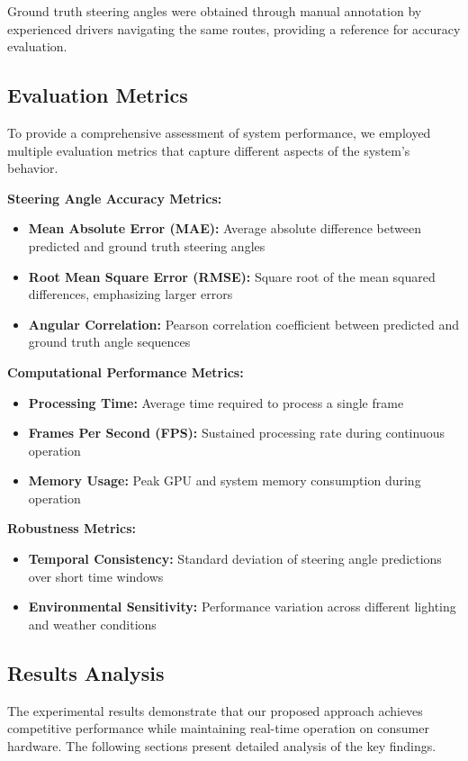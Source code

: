 \documentclass[conference]{IEEEtran}
\begin{document}
Ground truth steering angles were obtained through manual annotation by experienced drivers navigating the same routes, providing a reference for accuracy evaluation.

\subsection{Evaluation Metrics}
To provide a comprehensive assessment of system performance, we employed multiple evaluation metrics that capture different aspects of the system's behavior.

\textbf{Steering Angle Accuracy Metrics:}
\begin{itemize}
\item \textbf{Mean Absolute Error (MAE):} Average absolute difference between predicted and ground truth steering angles
\item \textbf{Root Mean Square Error (RMSE):} Square root of the mean squared differences, emphasizing larger errors
\item \textbf{Angular Correlation:} Pearson correlation coefficient between predicted and ground truth angle sequences
\end{itemize}

\textbf{Computational Performance Metrics:}
\begin{itemize}
\item \textbf{Processing Time:} Average time required to process a single frame
\item \textbf{Frames Per Second (FPS):} Sustained processing rate during continuous operation
\item \textbf{Memory Usage:} Peak GPU and system memory consumption during operation
\end{itemize}

\textbf{Robustness Metrics:}
\begin{itemize}
\item \textbf{Temporal Consistency:} Standard deviation of steering angle predictions over short time windows
\item \textbf{Environmental Sensitivity:} Performance variation across different lighting and weather conditions
\end{itemize}

\subsection{Results Analysis}
The experimental results demonstrate that our proposed approach achieves competitive performance while maintaining real-time operation on consumer hardware. The following sections present detailed analysis of the key findings.
\end{document}
